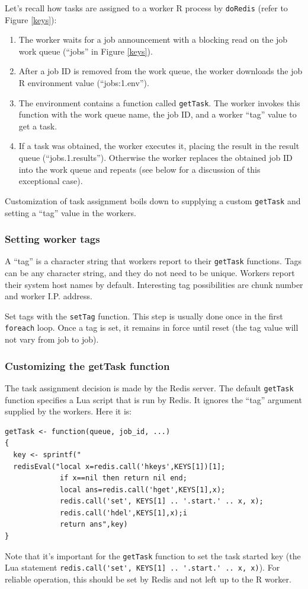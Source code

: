 \documentclass[12pt]{article}
\begin{document}
Let's recall how tasks are assigned to a worker R process by \verb+doRedis+
(refer to Figure \ref{keys}):
\begin{enumerate}
\item The worker waits for a job announcement with a blocking
      read on the job work queue (``jobs'' in Figure \ref{keys}).
\item After a job ID is removed from the work queue, the worker
      downloads the job R environment value (``jobs:1.env'').
\item The environment contains a function called \verb+getTask+. The
      worker invokes this function with the work queue name, the job ID,
      and a worker ``tag'' value to get a task.
\item If a task was obtained, the worker executes it, placing the result
      in the result queue \break(``jobs.1.results''). Otherwise the worker
      replaces the obtained job ID into the work queue and repeats
      (see below for a discussion of this exceptional case).
\end{enumerate}
Customization of task assignment boils down to supplying a custom
\verb+getTask+ and setting a ``tag'' value in the workers.


\subsubsection{Setting worker tags}

A ``tag'' is a character string that workers report to their \verb+getTask+
functions. Tags can be any character string, and they do not need to be unique.
Workers report their system host names by default. Interesting tag possibilities
are chunk number and worker I.P. address.

Set tags with the \verb+setTag+ function. This step is usually done once in the
first \verb+foreach+ loop.  Once a tag is set, it remains in force until reset
(the tag value will not vary from job to job).


\subsubsection{Customizing the getTask function}

The task assignment decision is made by the Redis server.  The default
\verb+getTask+ function specifies a Lua script that is run by Redis. It
ignores the ``tag'' argument supplied by the workers.  Here it is:
\begin{lstlisting}[float=!ht,caption=Default getTask function,basicstyle=\footnotesize\ttfamily,label=getTask]
getTask <- function(queue, job_id, ...)
{
  key <- sprintf("
  redisEval("local x=redis.call('hkeys',KEYS[1])[1];
             if x==nil then return nil end;
             local ans=redis.call('hget',KEYS[1],x);
             redis.call('set', KEYS[1] .. '.start.' .. x, x);
             redis.call('hdel',KEYS[1],x);i
             return ans",key)
}
\end{lstlisting}
Note that it's important for the \verb+getTask+ function to set the task started
key (the Lua statement \verb+redis.call('set', KEYS[1] .. '.start.' .. x, x)+).
For reliable operation, this should be set by Redis and not left up to the
R worker.
\end{document}
